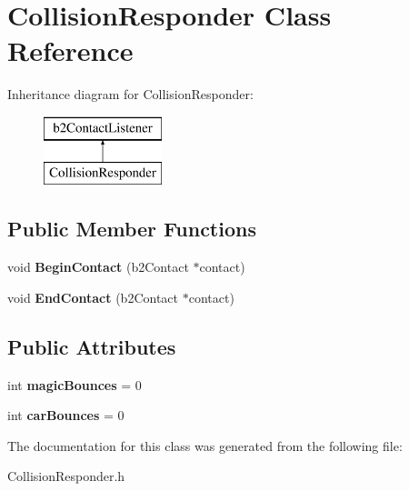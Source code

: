 \hypertarget{class_collision_responder}{}\section{Collision\+Responder Class Reference}
\label{class_collision_responder}
Inheritance diagram for Collision\+Responder\+:\begin{figure}[H]
\begin{center}
\leavevmode
\includegraphics[height=2.000000cm]{class_collision_responder}
\end{center}
\end{figure}
\subsection*{Public Member Functions}
\begin{DoxyCompactItemize}
\item 
void {\bfseries Begin\+Contact} (b2\+Contact $\ast$contact)\hypertarget{class_collision_responder_ac1787fca6f73864b1745579df5664660}{}\label{class_collision_responder_ac1787fca6f73864b1745579df5664660}

\item 
void {\bfseries End\+Contact} (b2\+Contact $\ast$contact)\hypertarget{class_collision_responder_a982f1bc8c1773e466a92f39b46ff2404}{}\label{class_collision_responder_a982f1bc8c1773e466a92f39b46ff2404}

\end{DoxyCompactItemize}
\subsection*{Public Attributes}
\begin{DoxyCompactItemize}
\item 
int {\bfseries magic\+Bounces} = 0\hypertarget{class_collision_responder_a20a5187fd7c80a6587e0afaaeecd490c}{}\label{class_collision_responder_a20a5187fd7c80a6587e0afaaeecd490c}

\item 
int {\bfseries car\+Bounces} = 0\hypertarget{class_collision_responder_ae86be5f70ea587f6831bb1a96e9ba36e}{}\label{class_collision_responder_ae86be5f70ea587f6831bb1a96e9ba36e}

\end{DoxyCompactItemize}


The documentation for this class was generated from the following file\+:\begin{DoxyCompactItemize}
\item 
Collision\+Responder.\+h\end{DoxyCompactItemize}
